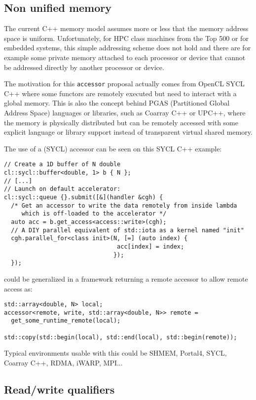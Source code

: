 \documentclass[a4paper]{article}
\begin{document}
\subsection{Non unified memory}
\label{sec:non-unified-memory}

The current C++ memory model assumes more or less that the memory
address space is uniform. Unfortunately, for HPC class machines from
the Top 500 or for embedded systems, this simple addressing scheme
does not hold and there are for example some private memory attached
to each processor or device that cannot be addressed directly by
another processor or device.

The motivation for this \lstinline|accessor| proposal actually comes
from OpenCL SYCL C++ where some functors are remotely executed but need
to interact with a global memory. This is also the concept behind PGAS
(Partitioned Global Address Space) languages or libraries, such as
Coarray C++ or UPC++, where the memory is physically distributed but
can be remotely accessed with some explicit language or library
support instead of transparent virtual shared memory.

The use of a (SYCL) accessor can be seen on this SYCL C++ example:
\begin{lstlisting}
// Create a 1D buffer of N double
cl::sycl::buffer<double, 1> b { N };
// [...]
// Launch on default accelerator:
cl::sycl::queue {}.submit([&](handler &cgh) {
  /* Get an accessor to write the data remotely from inside lambda
     which is off-loaded to the accelerator */
  auto acc = b.get_access<access::write>(cgh);
  // A DIY parallel equivalent of std::iota as a kernel named "init"
  cgh.parallel_for<class init>(N, [=] (auto index) {
                                acc[index] = index;
                               });
  });
\end{lstlisting}

could be generalized in a framework returning a remote accessor to
allow remote access as:
\begin{lstlisting}
std::array<double, N> local;
accessor<remote, write, std::array<double, N>> remote =
  get_some_runtime_remote(local);

std::copy(std::begin(local), std::end(local), std::begin(remote));
\end{lstlisting}

Typical environments usable with this could be SHMEM, Portal4, SYCL,
Coarray C++, RDMA, iWARP, MPI...


\subsection{Read/write qualifiers}
\label{sec:readwrite-qualifiers}
\end{document}
